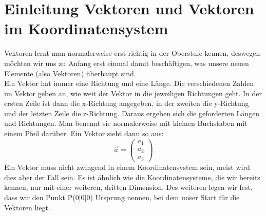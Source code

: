 \section{Einleitung Vektoren und Vektoren im Koordinatensystem}
Vektoren lernt man normalerweise erst richtig in der Oberstufe kennen, deswegen möchten wir uns zu Anfang erst einmal damit beschäftigen, was unsere neuen Elemente (also Vektoren) überhaupt sind.\\
Ein Vektor hat immer eine Richtung und eine Länge. Die verschiedenen Zahlen im Vektor geben an, wie weit der Vektor in die jeweiligen Richtungen geht. In der ersten Zeile ist dann die x-Richtung angegeben, in der zweiten die y-Richtung und der letzten Zeile die z-Richtung. Daraus ergeben sich die geforderten Längen und Richtungen. Man benennt sie normalerweise mit kleinen Buchstaben mit einem Pfeil darüber. Ein Vektor sieht dann so aus:
\[\vec{a}=\begin{pmatrix}
 a_1\\
 a_2\\
 a_3
\end{pmatrix}\]
Ein Vektor muss nicht zwingend in einem Koordinatensystem sein, meist wird dies aber der Fall sein. Es ist ähnlich wie die Koordinatensysteme, die wir bereits kennen, nur mit einer weiteren, dritten Dimension. Des weiteren legen wir fest, dass wir den Punkt P(0|0|0) Ursprung nennen, bei dem unser Start für die Vektoren liegt.


